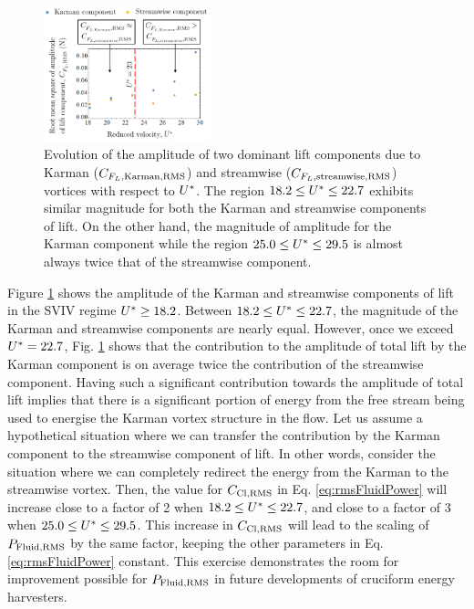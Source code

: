 \documentclass[a4paper,fleqn]{cas-sc}
\begin{document}
\begin{figure}
  \centering
  \includegraphics[width=0.43\textwidth]{figs/figure22}
  \caption{Evolution of the \rms{} amplitude of two dominant lift components due to Karman ($C_{F_{L},\text{Karman},\text{RMS}}$) and streamwise ($C_{F_{L},\text{streamwise},\text{RMS}}$) vortices with respect to $U^{*}$. The region $18.2 \leq U^{*} \leq 22.7$ exhibits similar magnitude for both the Karman and streamwise components of lift. On the other hand, the magnitude of amplitude for the Karman component while the region $25.0 \leq U^{*} \leq 29.5$ is almost always twice that of the streamwise component.}
  \label{fig:karmanStreamwiseComponents}
\end{figure}

Figure \ref{fig:karmanStreamwiseComponents} shows the \rms{} amplitude of the Karman and streamwise components of lift in the SVIV regime $U^{*} \geq 18.2$. Between $18.2 \leq U^{*} \leq 22.7$, the magnitude of the Karman and streamwise components are nearly equal. However, once we exceed $U^{*} = 22.7$, Fig. \ref{fig:karmanStreamwiseComponents} shows that the contribution to the \rms{} amplitude of total lift by the Karman component is on average twice the contribution of the streamwise component. Having such a significant contribution towards the \rms{} amplitude of total lift implies that there is a significant portion of energy from the free stream being used to energise the Karman vortex structure in the flow. Let us assume a hypothetical situation where we can transfer the contribution by the Karman component to the streamwise component of lift. In other words, consider the situation where we can completely redirect the energy from the Karman to the streamwise vortex. Then, the value for $C_{\text{Cl},\text{RMS}}$ in Eq. \ref{eq:rmsFluidPower} will increase close to a factor of 2 when $18.2 \leq U^{*} \leq 22.7$, and close to a factor of 3 when $25.0 \leq U^{*} \leq 29.5$. This increase in $C_{\text{Cl},\text{RMS}}$ will lead to the scaling of $P_{\text{Fluid,RMS}}$ by the same factor, keeping the other parameters in Eq. \ref{eq:rmsFluidPower} constant. This exercise demonstrates the room for improvement possible for $P_{\text{Fluid,RMS}}$ in future developments of cruciform energy harvesters.
\end{document}
